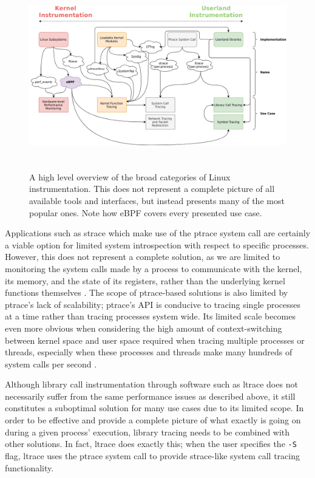 \documentclass[
  12pt]{findlay}
\begin{document}
\begin{figure}
\begin{center}
\includegraphics[keepaspectratio, height=3.2in]{../figures/instr-cmp.png}
\end{center}
\caption[A high level overview of the broad categories of Linux instrumentation]{
A high level overview of the broad categories of Linux instrumentation.
This does not represent a complete picture of all available tools and interfaces,
but instead presents many of the most popular ones. Note how eBPF covers every presented use case.
}
\label{instr-cmp}
\end{figure}

Applications such as strace \autocite{strace,manstrace} which make use
of the ptrace system call are certainly a viable option for limited
system introspection with respect to specific processes. However, this
does not represent a complete solution, as we are limited to monitoring
the system calls made by a process to communicate with the kernel, its
memory, and the state of its registers, rather than the underlying
kernel functions themselves \autocite{manptrace}. The scope of
ptrace-based solutions is also limited by ptrace's lack of scalability;
ptrace's API is conducive to tracing single processes at a time rather
than tracing processes system wide. Its limited scale becomes even more
obvious when considering the high amount of context-switching between
kernel space and user space required when tracing multiple processes or
threads, especially when these processes and threads make many hundreds
of system calls per second \autocite{keniston07}.

Although library call instrumentation through software such as ltrace
\autocite{rubirabranco07,manltrace} does not necessarily suffer from the
same performance issues as described above, it still constitutes a
suboptimal solution for many use cases due to its limited scope. In
order to be effective and provide a complete picture of what exactly is
going on during a given process' execution, library tracing needs to be
combined with other solutions. In fact, ltrace does exactly this; when
the user specifies the \texttt{-S} flag, ltrace uses the ptrace system
call to provide strace-like system call tracing functionality.
\end{document}
